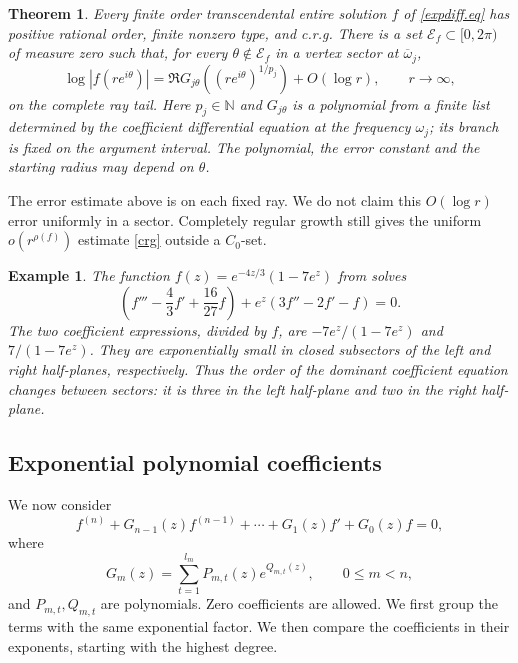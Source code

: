 \documentclass[a4paper,12pt]{article}
\newcommand{\N}{\mathbb{N}}
\newtheorem{theorem}[defin]{Theorem}
\newtheorem{exa}[defin]{Example}
\newenvironment{example}{\begin{exa}\rm}{\end{exa}}
\newenvironment{remark}
{\par\vspace{2.5mm}\noindent{\bf Remark.}}{\par\vspace{2.5mm}}
\numberwithin{equation}{section}
\begin{document}
\begin{theorem}\label{Thm.main}
Every finite order transcendental entire solution $f$ of \eqref{expdiff.eq}
has positive rational order, finite nonzero type, and \textit{c.r.g}.
There is a set $\mathcal E_f\subset[0,2\pi)$ of measure zero such that,
for every $\theta\notin\mathcal E_f$ in a vertex sector at $\overline\omega_j$,
\[
 \log|f(re^{i\theta})|
 =\Re G_{j\theta}((re^{i\theta})^{1/p_j})+O(\log r),
 \qquad r\to\infty,
\]
on the complete ray tail. Here $p_j\in\N$ and $G_{j\theta}$ is a polynomial
from a finite list determined by the coefficient differential equation
at the frequency $\omega_j$; its branch is fixed on the argument interval.
The polynomial, the error constant and the starting radius may depend on $\theta$.
\end{theorem}
\begin{remark}
The error estimate above is on each fixed ray. We do not claim this
$O(\log r)$ error uniformly in a sector. Completely regular growth
still gives the uniform $o(r^{\rho(f)})$ estimate \eqref{crg} outside a $C_0$-set.
\end{remark}

\begin{example}\label{ex.exp-sum.1}
The function $f(z)=e^{-4z/3}(1-7e^z)$ from
\cite[Example~3.6]{LiWangWen} solves
\[
 \left(f'''-\frac43f'+\frac{16}{27}f\right)
       +e^z(3f''-2f'-f)=0.
\]
The two coefficient expressions, divided by $f$, are
$-7e^z/(1-7e^z)$ and $7/(1-7e^z)$.
They are exponentially small in closed subsectors of the left and right
half-planes, respectively. Thus the order of the dominant coefficient
equation changes between sectors: it is three in the left half-plane
and two in the right half-plane.
\end{example}

\subsection{Exponential polynomial coefficients}\label{subsec.e-p.coeff}
We now consider
\begin{equation}\label{lde.exp-poly}
 f^{(n)}+G_{n-1}(z)f^{(n-1)}+\cdots+G_1(z)f'+G_0(z)f=0,
\end{equation}
where
\begin{equation}\label{coef.exp-poly}
 G_m(z)=\sum_{t=1}^{l_m}P_{m,t}(z)e^{Q_{m,t}(z)},
 \qquad 0\le m<n,
\end{equation}
and $P_{m,t},Q_{m,t}$ are polynomials. Zero coefficients are allowed.
We first group the terms with the same exponential factor.
We then compare the coefficients in their exponents, starting with the highest degree.
\end{document}
